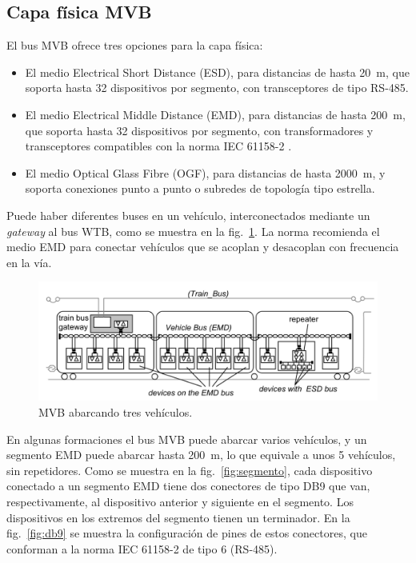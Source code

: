 \subsection{Capa física MVB}

El bus MVB ofrece tres opciones para la capa física:

\begin{itemize}
\item El medio Electrical Short Distance (ESD), para distancias de hasta 20~m, que soporta hasta 32 dispositivos por segmento, con transceptores de tipo RS-485.
\item El medio Electrical Middle Distance (EMD), para distancias de hasta 200~m, que soporta hasta  32 dispositivos por segmento, con transformadores y transceptores compatibles con la norma IEC 61158-2 \cite{iec61158_2}.
\item El medio Optical Glass Fibre (OGF), para distancias de hasta 2000~m, y soporta conexiones punto a punto o subredes de topología tipo estrella.
\end{itemize}

Puede haber diferentes buses en un vehículo, interconectados mediante un \textit{gateway} al bus WTB, como se muestra en la fig.~\ref{fig:emd-esd-wtb}.
La norma recomienda el medio EMD para conectar vehículos que se acoplan y desacoplan con frecuencia en la vía.

\begin{figure}[htbp]
	\centering
	\includegraphics[width=1\textwidth]{./Figures/tcn-emd-esd-wtb.png}
	\caption[MVB abarcando tres vehículos]{MVB abarcando tres vehículos.
        \\ }
    \label{fig:emd-esd-wtb}
\end{figure}

En algunas formaciones el bus MVB puede abarcar varios vehículos, y un segmento EMD puede abarcar hasta 200~m, lo que equivale a unos 5 vehículos, sin repetidores.
Como se muestra en la fig.~\ref{fig:segmento}, cada dispositivo conectado a un segmento EMD tiene dos conectores de tipo DB9 que van, respectivamente, al dispositivo anterior y siguiente en el segmento. Los dispositivos en los extremos del segmento tienen un terminador.
En la fig.~\ref{fig:db9} se muestra la configuración de pines de estos conectores, que conforman a la norma IEC 61158-2 de tipo 6 (RS-485).


